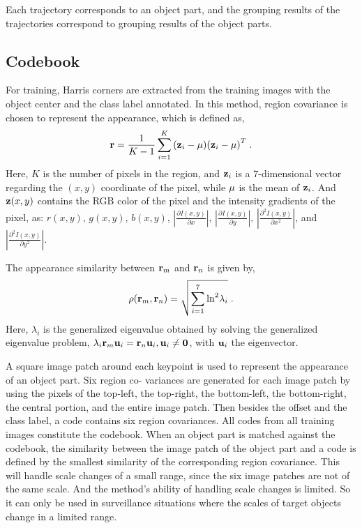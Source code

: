 \documentclass{mva2011}
\begin{document}
Each trajectory corresponds to an object part, and the grouping results of the trajectories correspond to grouping results of the object parts.
\subsection{Codebook}
For training, Harris corners are extracted from the training images with the object center and the class label annotated. In this method, region covariance is chosen to represent the appearance, which is defined as,
\[{\bf{r}} = \frac{1}{{K - 1}}\sum\limits_{i = 1}^K {({{\bf{z}}_i} - {\bf{\mu }}){{({{\bf{z}}_i} - {\bf{\mu }})}^T}} \;.\]
Here, $K$ is the number of pixels in the region, and ${{\bf{z}}_i}$ is a $7$-dimensional vector regarding the $(x,y)$ coordinate of the pixel, while ${\bf{\mu }}$ is the mean of ${{\bf{z}}_i}$.   And ${{\bf{z}}}(x,y)$ contains the RGB color of the pixel and the intensity gradients of the pixel, as: $r(x,y)$, $g(x,y)$, $b(x,y)$, $|\frac {\partial I(x,y)} {\partial x}|$, $|\frac{\partial I(x,y)}{\partial y}|$, $|\frac{{\partial ^2}I(x,y)}{\partial {x^2}}|$, and $|\frac{{\partial ^2}I(x,y)}{\partial {y^2}}|$.

The appearance similarity between ${\bf{r}}_m$ and ${\bf{r}}_n$ is given by,
\[
\rho ({\bf{r}}_m,{\bf{r}}_n) = \sqrt {\sum\limits_{i = 1}^7 {{{\ln }^2}{\lambda _i}} }\;.
\]
Here, $\lambda _i$ is the generalized eigenvalue obtained by solving the generalized eigenvalue problem, ${\lambda _i}{\bf{r}}_m{{\bf{u}}_i} = {\bf{r}}_n {{\bf{u}}_i},{{\bf{u}}_i} \ne {\bf{0}}$, with ${\bf{u}}_i$ the eigenvector.

A square image patch around each keypoint is used to
represent the appearance of an object part. Six region co-
variances are generated for each image patch by using the
pixels of the top-left, the top-right, the bottom-left, the
bottom-right, the central portion, and the entire image patch. Then
besides the offset and the class label, a code contains six
region covariances.   All codes from all training images constitute the codebook. When an object part is matched against
the codebook, the similarity between the image patch of the
object part and a code is defined by the smallest similarity
of the corresponding region covariance. {\color{red}This will handle scale changes of a small range, since the six image patches are not of the same scale. And the method's ability of handling scale changes is limited. So it can only be used in surveillance situations where the scales of target objects change in a limited range.}
\end{document}

